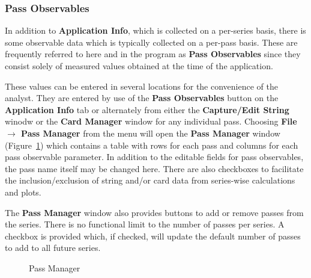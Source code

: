\documentclass[10pt,letterpaper,titlepage]{article}
\begin{document}
    \subsubsection{Pass Observables}
    In addition to \textbf{Application Info}, which is collected on a per-series basis, there is some observable data which is typically collected on a per-pass basis. These are frequently referred to here and in the program as \textbf{Pass Observables} since they consist solely of measured values obtained at the time of the application.\par
    These values can be entered in several locations for the convenience of the analyst. They are entered by use of the \textbf{Pass Observables} button on the \textbf{Application Info} tab or alternately from either the \textbf{Capture/Edit String} winodw or the \textbf{Card Manager} window for any individual pass. Choosing \textbf{File $\rightarrow$ Pass Manager} from the menu will open the \textbf{Pass Manager} window (Figure~\ref{fig:pass_manager}) which contains a table with rows for each pass and columns for each pass observable parameter. In addition to the editable fields for pass observables, the pass name itself may be changed here. There are also checkboxes to facilitate the inclusion/exclusion of string and/or card data from series-wise calculations and plots.\par
    The \textbf{Pass Manager} window also provides buttons to add or remove passes from the series. There is no functional limit to the number of passes per series. A checkbox is provided which, if checked, will update the default number of passes to add to all future series.
    \begin{figure}[hb]
        \centering
        \caption{Pass Manager}
        \label{fig:pass_manager}
    \end{figure}
    \newpage
\end{document}
